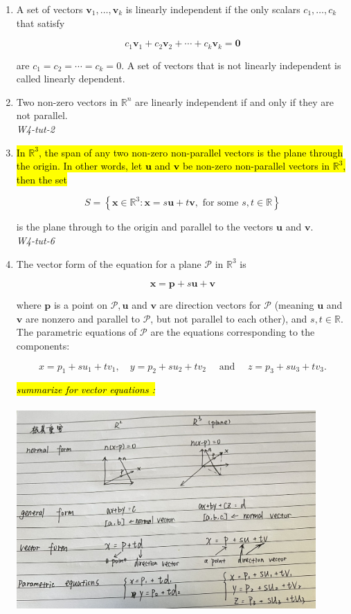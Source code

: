 \documentclass[10pt]{article}
\begin{document}
\begin{enumerate}
\item A set of vectors $\mathbf{v}_{1}, \ldots, \mathbf{v}_{k}$ is linearly independent if the only scalars $c_{1}, \ldots, c_{k}$ that satisfy

$$
c_{1} \mathbf{v}_{1}+c_{2} \mathbf{v}_{2}+\cdots+c_{k} \mathbf{v}_{k}=\mathbf{0}
$$

are $c_{1}=c_{2}=\cdots=c_{k}=0$. A set of vectors that is not linearly independent is called linearly dependent.

\item Two non-zero vectors in $\mathbb{R}^{n}$ are linearly independent if and only if they are not parallel.\\
\textit{W4-tut-2}

\item \hl{In $\mathbb{R}^{3}$, the span of any two non-zero non-parallel vectors is the plane through the origin. In other words, let $\mathbf{u}$ and $\mathbf{v}$ be non-zero non-parallel vectors in $\mathbb{R}^{3}$, then the set}

$$
S=\left\{\mathbf{x} \in \mathbb{R}^{3}: \mathbf{x}=s \mathbf{u}+t \mathbf{v}, \text { for some } s, t \in \mathbb{R}\right\}
$$

is the plane through to the origin and parallel to the vectors $\mathbf{u}$ and $\mathbf{v}$.\\
\textit{W4-tut-6}

\item The vector form of the equation for a plane $\mathcal{P}$ in $\mathbb{R}^{3}$ is

$$
\mathbf{x}=\mathbf{p}+s \mathbf{u}+\mathbf{v}
$$

where $\mathbf{p}$ is a point on $\mathcal{P}, \mathbf{u}$ and $\mathbf{v}$ are direction vectors for $\mathcal{P}$ (meaning $\mathbf{u}$ and $\mathbf{v}$ are nonzero and parallel to $\mathcal{P}$, but not parallel to each other), and $s, t \in \mathbb{R}$. The parametric equations of $\mathcal{P}$ are the equations corresponding to the components:

$$
x=p_{1}+s u_{1}+t v_{1}, \quad y=p_{2}+s u_{2}+t v_{2} \quad \text { and } \quad z=p_{3}+s u_{3}+t v_{3} .
$$


\hl{\textit{summarize for vector equations :}} \\\\
\includegraphics[width=0.9\textwidth]{images/w4-1.jpeg}\\


\end{enumerate}
\end{document}
